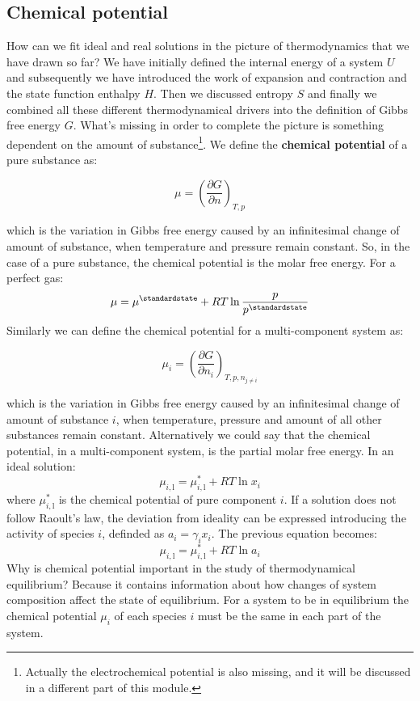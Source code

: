 \documentclass[12pt,a4paper]{report}
\newif\ifstudents
\begin{document}
   \subsection*{Chemical potential}
   How can we fit ideal and real solutions in the picture of thermodynamics that we have drawn so far? We have initially defined the internal energy of a system $U$ and subsequently we have introduced the work of expansion and contraction and the state function enthalpy $H$. Then we discussed entropy $S$ and finally we combined all these different thermodynamical drivers into the definition of Gibbs free energy $G$. What's missing in order to complete the picture is something dependent on the amount of substance\footnote{Actually the electrochemical potential is also missing, and it will be discussed in a different part of this module.}. We define the \textbf{chemical potential} of a pure substance as:
   \ifstudents \hideit[2]{ \fi
   \begin{equation*}
   \mu = \left(\frac{\partial G}{\partial n}\right)_{T,p}
   \end{equation*}
   \ifstudents } \fi
   which is the variation in Gibbs free energy caused by an infinitesimal change of amount of substance, when temperature and pressure remain constant. So, in the case of a pure substance, the chemical potential is the molar free energy.
   For a perfect gas:
   \begin{equation*}
   \mu =\mu^{\standardstate}+RT\ln\frac{p}{p^{\standardstate}} 
   \end{equation*}
   Similarly we can define the chemical potential for a multi-component system as:
   \ifstudents \hideit[2]{ \fi
   \begin{equation*}
   \mu_{i} = \left(\frac{\partial G}{\partial n_{i}}\right)_{T,p,n_{j\neq i}}
   \end{equation*}
   \ifstudents } \fi
   which is the variation in Gibbs free energy caused by an infinitesimal change of amount of substance $i$, when temperature, pressure and amount of all other substances remain constant. Alternatively we could say that the chemical potential, in a multi-component system, is the partial molar free energy.
   In an ideal solution: 
  \begin{equation*}
  \mu_{i,\mathrm{l}} =\mu^{*}_{i,\mathrm{l}}+RT\ln x_{i} 
  \end{equation*}
  where $\mu^{*}_{i,\mathrm{l}}$ is the chemical potential of pure component $i$.
  If a solution does not follow Raoult's law, the deviation from ideality can be expressed introducing the activity of species $i$, definded as $a_{i}=\gamma_{i} x_{i}$. The previous equation becomes:
  \begin{equation*}
  \mu_{i,\mathrm{l}} =\mu^{*}_{i,\mathrm{l}}+RT\ln a_{i} 
  \end{equation*}
  Why is chemical potential important in the study of thermodynamical equilibrium? Because it contains information about how changes of system composition affect the state of equilibrium. For a system to be in equilibrium the chemical potential $\mu_{i}$ of each species $i$ must be the same in each part of the system.
\end{document}
